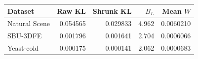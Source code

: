 \begin{center}
\begin{tabular}{lrrrr}
\hline
Dataset & Raw KL & Shrunk KL & $B_L$ & Mean $W$\\
\hline
Natural Scene & 0.054565 & 0.029833 & 4.962 & 0.0060210\\
SBU-3DFE & 0.001796 & 0.001641 & 2.704 & 0.0006066\\
Yeast-cold & 0.000175 & 0.000141 & 2.062 & 0.0000683\\
\hline
\end{tabular}
\end{center}
